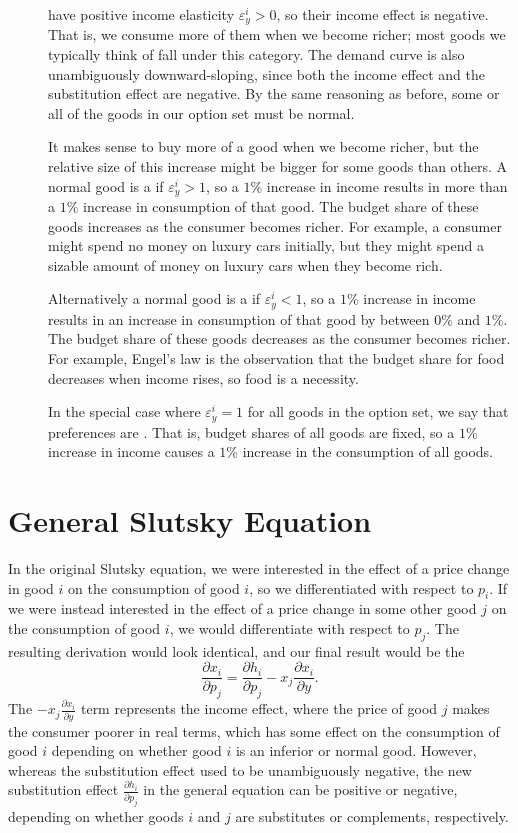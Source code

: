 \begin{description}
\item[] have positive income elasticity $\varepsilon_y^i > 0$, so their income effect is negative. That is, we consume more of them when we become richer; most goods we typically think of fall under this category. The demand curve is also unambiguously downward-sloping, since both the income effect and the substitution effect are negative. By the same reasoning as before, some or all of the goods in our option set must be normal.

It makes sense to buy more of a good when we become richer, but the relative size of this increase might be bigger for some goods than others. A normal good is a  if $\varepsilon_y^i > 1$, so a $1\%$ increase in income results in more than a $1\%$ increase in consumption of that good. The budget share of these goods increases as the consumer becomes richer. For example, a consumer might spend no money on luxury cars initially, but they might spend a sizable amount of money on luxury cars when they become rich.

Alternatively a normal good is a  if $\varepsilon_y^i < 1$, so a $1\%$ increase in income results in an increase in consumption of that good by between $0\%$ and $1\%$. The budget share of these goods decreases as the consumer becomes richer. For example, Engel's law is the observation that the budget share for food decreases when income rises, so food is a necessity.

In the special case where $\varepsilon_y^i = 1$ for all goods in the option set, we say that preferences are . That is, budget shares of all goods are fixed, so a $1\%$ increase in income causes a $1\%$ increase in the consumption of all goods.

\end{description}

\section{General Slutsky Equation}
In the original Slutsky equation, we were interested in the effect of a price change in good $i$ on the consumption of good $i$, so we differentiated with respect to $p_i$. If we were instead interested in the effect of a price change in some other good $j$ on the consumption of good $i$, we would differentiate with respect to $p_j$. The resulting derivation would look identical, and our final result would be the 
$$
\boxed{\frac{\partial x_{i}}{\partial p_{j}}=\frac{\partial h_{i}}{\partial p_{j}}-x_{j} \frac{\partial x_{i}}{\partial y}.}
$$
The $-x_{j} \frac{\partial x_{i}}{\partial y}$ term represents the income effect, where the price of good $j$ makes the consumer poorer in real terms, which has some effect on the consumption of good $i$ depending on whether good $i$ is an inferior or normal good. However, whereas the substitution effect used to be unambiguously negative, the new substitution effect $\frac{\partial h_{i}}{\partial p_{j}}$ in the general equation can be positive or negative, depending on whether goods $i$ and $j$ are substitutes or complements, respectively.

